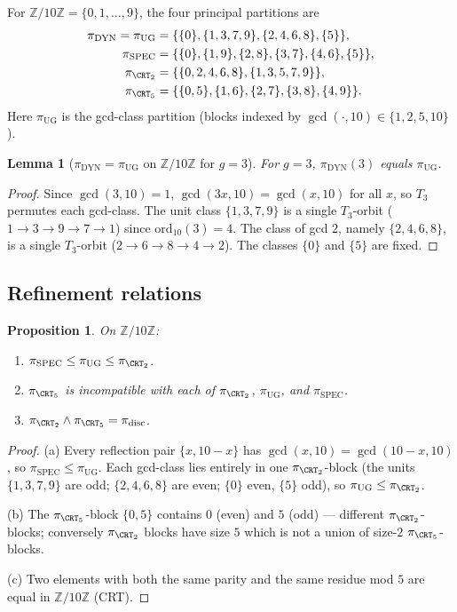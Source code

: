 \documentclass[11pt,reqno]{amsart}
\theoremstyle{plain}
\newtheorem{lemma}[theorem]{Lemma}
\newtheorem{proposition}[theorem]{Proposition}
\theoremstyle{definition}
\newcommand{\Z}{\mathbb{Z}}
\newcommand{\meet}{\wedge}
\newcommand{\disc}{\mathrm{disc}}
\newcommand{\DYN}{\mathrm{DYN}}
\newcommand{\SPEC}{\mathrm{SPEC}}
\newcommand{\UG}{\mathrm{UG}}
\newcommand{\ord}{\mathrm{ord}}
\begin{document}
For $\Z/10\Z = \{0,1,\ldots,9\}$, the four principal partitions are
\begin{align*}
\pi_{\DYN} = \pi_{\UG} &= \{\{0\}, \{1,3,7,9\}, \{2,4,6,8\}, \{5\}\},\\
\pi_{\SPEC} &= \{\{0\}, \{1,9\}, \{2,8\}, \{3,7\}, \{4,6\}, \{5\}\},\\
\pi_{\CRT_2} &= \{\{0,2,4,6,8\}, \{1,3,5,7,9\}\},\\
\pi_{\CRT_5} &= \{\{0,5\}, \{1,6\}, \{2,7\}, \{3,8\}, \{4,9\}\}.
\end{align*}
Here $\pi_{\UG}$ is the gcd-class partition (blocks indexed by $\gcd(\cdot, 10) \in \{1,2,5,10\}$).

\begin{lemma}[$\pi_{\DYN} = \pi_{\UG}$ on $\Z/10\Z$ for $g = 3$] \label{lem:dyn-ug}
For $g = 3$, $\pi_{\DYN}(3)$ equals $\pi_{\UG}$.
\end{lemma}

\begin{proof}
Since $\gcd(3, 10) = 1$, $\gcd(3 x, 10) = \gcd(x, 10)$ for all $x$, so $T_3$ permutes each gcd-class. The unit class $\{1,3,7,9\}$ is a single $T_3$-orbit ($1 \to 3 \to 9 \to 7 \to 1$) since $\ord_{10}(3) = 4$. The class of gcd $2$, namely $\{2,4,6,8\}$, is a single $T_3$-orbit ($2 \to 6 \to 8 \to 4 \to 2$). The classes $\{0\}$ and $\{5\}$ are fixed.
\end{proof}

\subsection{Refinement relations}

\begin{proposition} \label{prop:n10-lattice}
On $\Z/10\Z$:
\begin{enumerate}[label=(\alph*)]
\item $\pi_{\SPEC} \leq \pi_{\UG} \leq \pi_{\CRT_2}$.
\item $\pi_{\CRT_5}$ is incompatible with each of $\pi_{\CRT_2}$, $\pi_{\UG}$, and $\pi_{\SPEC}$.
\item $\pi_{\CRT_2} \meet \pi_{\CRT_5} = \pi_{\disc}$.
\end{enumerate}
\end{proposition}

\begin{proof}
(a) Every reflection pair $\{x, 10-x\}$ has $\gcd(x,10) = \gcd(10-x,10)$, so $\pi_{\SPEC} \leq \pi_{\UG}$. Each gcd-class lies entirely in one $\pi_{\CRT_2}$-block (the units $\{1,3,7,9\}$ are odd; $\{2,4,6,8\}$ are even; $\{0\}$ even, $\{5\}$ odd), so $\pi_{\UG} \leq \pi_{\CRT_2}$.

(b) The $\pi_{\CRT_5}$-block $\{0,5\}$ contains $0$ (even) and $5$ (odd) --- different $\pi_{\CRT_2}$-blocks; conversely $\pi_{\CRT_2}$ blocks have size $5$ which is not a union of size-$2$ $\pi_{\CRT_5}$-blocks.

(c) Two elements with both the same parity and the same residue mod $5$ are equal in $\Z/10\Z$ (CRT).
\end{proof}
\end{document}
